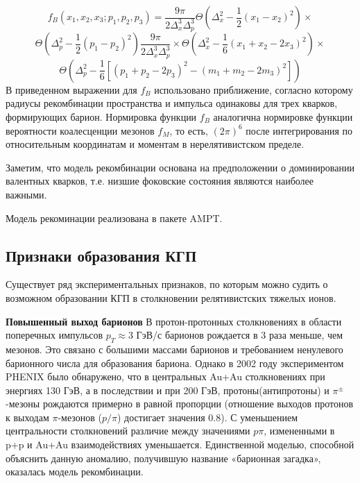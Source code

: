 $$f_B(x_1, x_2, x_3; p_1, p_2, p_3) = \frac{9 \pi}{2\Delta_{x}^3 \Delta_{p}^3} 
\Theta \left( \Delta_{x}^2 - \frac{1}{2} (x_1 - x_2)^2\right) \times $$
$$\Theta \left( \Delta_{p}^2 - \frac{1}{2} (p_1 - p_2)^2\right) \frac{9 \pi}{2\Delta_{x}^3 \Delta_{p}^3}\times
\Theta \left( \Delta_{x}^2 - \frac{1}{6} (x_1 + x_2 - 2 x_3)^2\right) \times $$
$$\Theta \left( \Delta_{p}^2 - \frac{1}{6} \left[ (p_1 + p_2 - 2 p_3)^2 - (m_1 + m_2 -2 m_3)^2 \right] \right) $$
В приведенном выражении для $f_B$ использовано приближение, согласно которому радиусы рекомбинации пространства и импульса одинаковы для трех кварков, формирующих барион. Нормировка функции $f_B$ аналогична нормировке функции вероятности коалесценции мезонов $f_M$, то есть, $(2\pi)^6$ после интегрирования по относительным координатам и моментам в нерелятивистском пределе. 

Заметим, что модель рекомбинации основана на предположении о доминировании валентных кварков, т.е. низшие фоковские состояния являются наиболее важными. 

Модель рекоминации реализована в пакете AMPT.


\subsection{Признаки образования КГП} \label{subsec:ch1/sec1_1}
Существует ряд экспериментальных признаков, по которым можно судить о возможном образовании КГП в столкновении релятивистских тяжелых ионов. 

\textbf{Повышенный выход барионов}
В протон-протонных столкновениях в области поперечных импульсов $p_T \approx $3 ГэВ/с барионов рождается в 3 раза меньше, чем мезонов. Это связано с большими массами барионов и требованием ненулевого барионного числа для образования бариона.
Однако в 2002 году экспериментом PHENIX было обнаружено, что в центральных Au+Au столкновениях при энергиях 130 ГэВ, а в последствии и при 200 ГэВ, протоны(антипротоны) и $\pi^{\pm}$-мезоны рождаются примерно в равной пропорции (отношение выходов протонов к выходам $\pi$-мезонов ($p/\pi$) достигает значения 0.8). С уменьшением центральности столкновений различие между значениями $p\pi$, измененными в p+p и Au+Au взаимодействиях уменьшается. Единственной моделью, способной объяснить данную аномалию, получившую название «барионная загадка», оказалась модель рекомбинации.

